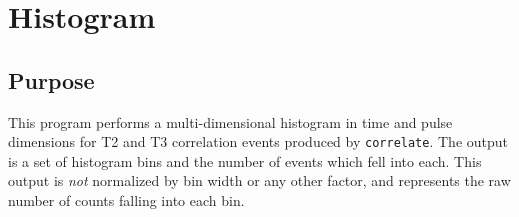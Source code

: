 \documentclass{article}
\newcommand{\intensity}{\texttt{intensity}}
\newcommand{\correlate}{\texttt{correlate}}
\newcommand{\gn}[1]{\ensuremath{g^{(#1)}}}
\begin{document}
%
%
%




\section{Histogram}
\label{sec:histogram}

\subsection{Purpose}
This program performs a multi-dimensional histogram in time and pulse dimensions for T2 and T3 correlation events produced by \correlate. The output is a set of histogram bins and the number of events which fell into each. This output is \textit{not} normalized by bin width or any other factor, and represents the raw number of counts falling into each bin.
\end{document}
